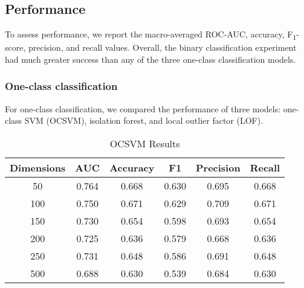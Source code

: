 \documentclass{article}
\begin{document}
\hypertarget{performance}{%
\subsection{Performance}\label{performance}}

To assess performance, we report the macro-averaged ROC-AUC, accuracy,
F\textsubscript{1}-score, precision, and recall values. Overall, the
binary classification experiment had much greater success than any of
the three one-class classification models.

\hypertarget{one-class-classification}{%
\subsubsection{One-class
classification}\label{one-class-classification}}

For one-class classification, we compared the performance of three
models: one-class SVM (OCSVM), isolation forest, and local outlier
factor (LOF).

\begin{table}
 \caption{OCSVM Results}
  \centering
  \begin{tabular}{|c|c|c|c|c|c|}
    \hline
    \rowcolor{lightgray} \textbf{Dimensions} & \textbf{AUC} & \textbf{Accuracy} & \textbf{F1} & \textbf{Precision} & \textbf{Recall} \\
    \hline
    50 & \cellcolor{green} 0.764 & 0.668 & \cellcolor{green} 0.630 & 0.695 & 0.668 \\
    \hline
    \cellcolor{green} 100 & 0.750 & \cellcolor{green} 0.671 & 0.629 & \cellcolor{green} 0.709 & \cellcolor{green} 0.671 \\
    \hline
    150 & 0.730 & 0.654 & 0.598 & 0.693 & 0.654 \\
    \hline
    200 & 0.725 & 0.636 & 0.579 & 0.668 & 0.636 \\
    \hline
    250 & 0.731 & 0.648 & 0.586 & 0.691 & 0.648 \\
    \hline
    500 & 0.688 & 0.630 & 0.539 & 0.684 & 0.630 \\
    \hline
  \end{tabular}
  \label{tab:ocsvm}
\end{table}
\end{document}
